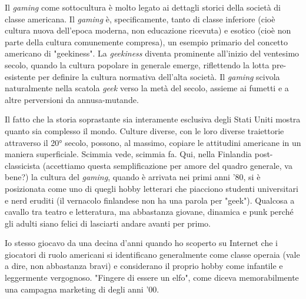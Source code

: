 Il \textit{gaming} come sottocultura è molto legato ai dettagli storici della società di classe americana. Il \textit{gaming} è, specificamente, tanto di classe inferiore (cioè cultura nuova dell'epoca moderna, non educazione ricevuta) e esotico (cioè non parte della cultura comunemente compresa), un esempio primario del concetto americano di "geekiness". La \textit{geekiness} diventa prominente all'inizio del ventesimo secolo, quando la cultura popolare in generale emerge, riflettendo la lotta pre-esistente per definire la cultura normativa dell'alta società. Il \textit{gaming} scivola naturalmente nella scatola \textit{geek} verso la metà del secolo, assieme ai fumetti e a altre perversioni da annusa-mutande.

Il fatto che la storia soprastante sia interamente esclusiva degli Stati Uniti mostra quanto sia complesso il mondo. Culture diverse, con le loro diverse traiettorie attraverso il 20° secolo, possono, al massimo, copiare le attitudini americane in un maniera superficiale. Scimmia vede, scimmia fa. Qui, nella Finlandia post-classicista (accettiamo questa semplificazione per amore del quadro generale, va bene?) la cultura del \textit{gaming}, quando è arrivata nei primi anni '80, si è posizionata come uno di quegli hobby letterari che piacciono studenti universitari e nerd eruditi (il vernacolo finlandese non ha una parola per "geek"). Qualcosa a cavallo tra teatro e letteratura, ma abbastanza giovane, dinamica e punk perché gli adulti siano felici di lasciarti andare avanti per primo.

Io stesso giocavo da una decina d'anni quando ho scoperto su Internet che i giocatori di ruolo americani si identificano generalmente come classe operaia (vale a dire, non abbastanza bravi) e considerano il proprio hobby come infantile e leggermente vergognoso. "Fingere di essere un elfo", come diceva memorabilmente una campagna marketing di \dnd{} degli anni '00.

